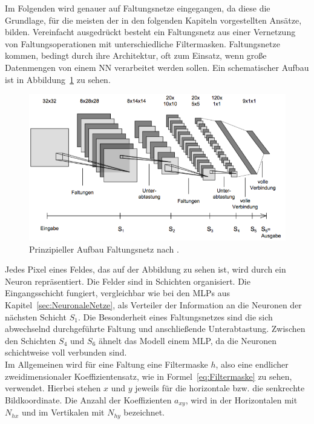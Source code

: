 \documentclass[times, 12pt,twocolumn]{article}
\begin{document}
 \label{sec:Faltungsnetze}
Im Folgenden wird genauer auf Faltungsnetze eingegangen, da diese die Grundlage, für die meisten der in den folgenden Kapiteln vorgestellten Ansätze, bilden. Vereinfacht ausgedrückt besteht ein Faltungsnetz aus einer Vernetzung von Faltungsoperationen mit unterschiedliche Filtermasken. Faltungsnetze kommen, bedingt durch ihre Architektur, oft zum Einsatz, wenn große Datenmengen von einem NN verarbeitet werden sollen. Ein schematischer Aufbau ist in Abbildung~\ref{fig:CNN} zu sehen. 

\begin{figure}
	\flushleft
	\includegraphics[width=\columnwidth]{Bilder/structure-cnn.jpg}
	\caption{Prinzipieller Aufbau Faltungsnetz nach \cite{Osadchy}.}
	\label{fig:CNN}
\end{figure}

Jedes Pixel eines Feldes, das auf der Abbildung zu sehen ist, wird durch ein Neuron repräsentiert. Die Felder sind in Schichten organisiert. Die Eingangsschicht fungiert, vergleichbar wie bei den MLPs aus Kapitel~\ref{sec:NeuronaleNetze}, als Verteiler der Information an die Neuronen der nächsten Schicht $S_1$. Die Besonderheit eines Faltungsnetzes sind die sich abwechselnd durchgeführte Faltung und anschließende Unterabtastung. Zwischen den Schichten $S_4$ und $S_6$ ähnelt das Modell einem MLP, da die Neuronen schichtweise voll verbunden sind.\\

Im Allgemeinen wird für eine Faltung eine Filtermaske $h$, also eine endlicher zweidimensionaler Koeffizientensatz, wie in Formel~\ref{eq:Filtermaske} zu sehen, verwendet. Hierbei stehen $x$ und $y$ jeweils für die horizontale bzw. die senkrechte Bildkoordinate. Die Anzahl der Koeffizienten $a_{xy}$, wird in der Horizontalen mit $N_{hx}$ und im Vertikalen mit $N_{hy}$ bezeichnet. 
\end{document}
